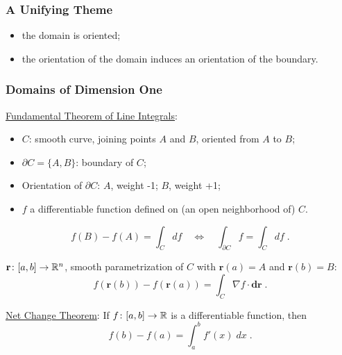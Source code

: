 \begin{frame}
  \frametitle{A Unifying Theme}

 \begin{center}
 \end{center}
\begin{itemize}
  \item the domain is oriented;
  \item the orientation of the domain induces an orientation of the boundary.
\end{itemize}


\end{frame}

\begin{frame}
  \frametitle{Domains of Dimension One}

\underline{Fundamental Theorem of Line Integrals}:
\begin{itemize}
  \item $C$: smooth curve, joining points $A$ and $B$, oriented from $A$ to $B$;
  \item $\partial C = \{A,B\}$: boundary of $C$;
  \item Orientation of $\partial C$: $A$, weight -1; $B$, weight +1;
  \item $f$ a differentiable function defined on (an open neighborhood of) $C$.
\end{itemize}
%
$$f(B)-f(A) =\int_C df \quad \Longleftrightarrow \quad \int_{\partial C} f = \int_C df\;.$$

$\textbf{r} \colon [a,b] \to {\mathbb{R}}^n$, smooth parametrization of $C$ with $\textbf{r}(a) = A$ and $\textbf{r}(b)=B$:
%
$$
  f(\textbf{r}(b)) - f(\textbf{r}(a)) = \int_C \nabla f \cdot  \textbf{dr}\; .
$$


\underline{Net Change Theorem}: If $f \colon [a,b] \to {\mathbb{R}}$ is a differentiable function, then
%
$$
   f(b)-f(a) = \int_{a}^b f'(x) \; dx\; .
$$


\end{frame}

